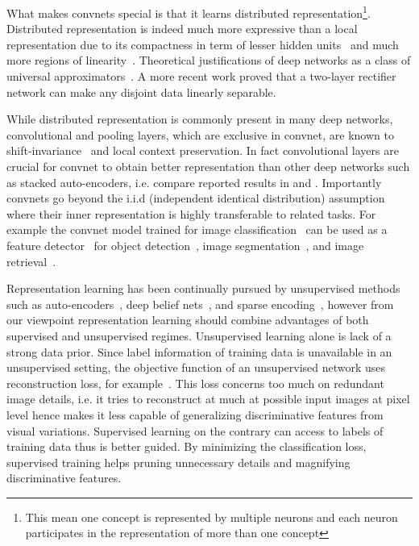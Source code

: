 \documentclass[preprint,12pt]{elsarticle}
\begin{document}
What makes convnets special is that it learns distributed representation\footnote{ This mean one concept is represented by multiple neurons and each neuron participates in the representation of more than one concept}. Distributed representation is indeed much more expressive than a local representation due to its compactness in term of lesser hidden units~\cite{DBLP:conf/nips/DelalleauB11} and much more regions of linearity~\cite{DBLP:conf/nips/MontufarPCB14}. Theoretical justifications of deep networks as a class of universal approximators~\cite{DBLP:journals/mcss/Cybenko92,DBLP:journals/nn/HornikSW89}. A more recent work \cite{DBLP:conf/icml/AnBB15} proved that a two-layer rectifier network can make any disjoint data linearly separable. 

While distributed representation is commonly present in many deep networks, convolutional and pooling layers, which are exclusive in convnet, are known to shift-invariance~\cite{DBLP:journals/corr/abs-1301-3537} and local context preservation. In fact convolutional layers are crucial for convnet to obtain better representation than other deep networks such as stacked auto-encoders, i.e. compare reported results in \cite{DBLP:conf/icml/LeRMDCCDN12} and \cite{DBLP:conf/nips/KrizhevskySH12}. Importantly convnets go beyond the i.i.d (independent identical distribution) assumption where their  inner representation is highly transferable to related tasks. For example the convnet model trained for image classification~\cite{DBLP:conf/nips/KrizhevskySH12} can be used as a feature detector~\cite{DBLP:journals/corr/RazavianASC14} for object detection~\cite{DBLP:conf/cvpr/ErhanSTA14}, image segmentation~\cite{DBLP:journals/corr/LongSD14}, and image retrieval~\cite{DBLP:conf/eccv/BabenkoSCL14,DBLP:conf/cvpr/WangSLRWPCW14}. 

Representation learning has been continually pursued by unsupervised methods such as auto-encoders~\cite{hinton2006reducing}, deep belief nets~\cite{DBLP:journals/neco/HintonOT06}, and sparse encoding~\cite{poultney2006efficient}, however from our viewpoint representation learning should combine advantages of both supervised and unsupervised regimes. Unsupervised learning alone is lack of a strong data prior. Since label information of training data is unavailable in an unsupervised setting, the objective function of an unsupervised network uses reconstruction loss, for example~\cite{hinton2006reducing}. This loss concerns too much on redundant image details, i.e. it tries to reconstruct at much at possible input images at pixel level hence  makes it less capable of generalizing discriminative features from visual variations. Supervised learning on the contrary can access to labels of training data thus is better guided. By minimizing the classification loss, supervised training helps pruning unnecessary details and magnifying discriminative features. 
\end{document}
